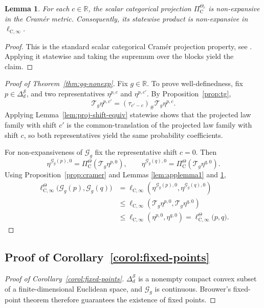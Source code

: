 \documentclass{article}
\newtheorem{lemma}[theorem]{Lemma}
\newcommand{\X}{\mathcal{S}}
\newcommand{\R}{\mathbb{R}}
\begin{document}
\begin{lemma}\label{lem:applemma2}
For each $c \in \R$, the scalar categorical projection $\Pi^{\Theta_c}_\mathrm C$ is non-expansive in the Cram\'er metric. Consequently, its statewise product is non-expansive in $\ell_{\mathrm C, \infty}$.
\end{lemma}
\begin{proof}
This is the standard scalar categorical Cram\'er projection property, see \citet{rowland2018analysis}. Applying it statewise and taking the supremum over the blocks yield the claim.
\end{proof}
\begin{proof}[Proof of Theorem~\ref{thm:gg-nonexp}]
Fix $g \in \R$. To prove well-definedness, fix $p \in \Delta^\X_d$, and two representatives $\eta^{p, c}$ and $\eta^{p, c'}$. By Proposition~\ref{prop:tg},
\begin{equation}
\mathcal T_g \eta^{p, c'} = (\tau_{c'-c})_\# \mathcal T_g \eta^{p, c}.
\end{equation}
Applying Lemma~\ref{lem:proj-shift-equiv} statewise shows that the projected law family with shift $c'$ is the common-translation of the projected law family with shift $c$, so both representatives yield the same probability coefficients.

For non-expansiveness of $\mathcal G_g$ fix the representative shift $c = 0$. Then
\begin{equation}
\eta^{\mathcal G_g(p), 0} = \Pi^\Theta_\mathrm C(\mathcal T_g \eta^{p, 0}), \qquad \eta^{\mathcal G_g(q), 0} =\Pi^\Theta_\mathrm C(\mathcal T_g \eta^{q, 0}).
\end{equation}
Using Proposition~\ref{prop:cramer} and Lemmas \ref{lem:applemma1} and \ref{lem:applemma2},
\begin{equation}
\begin{aligned}
\ell^\Theta_{\mathrm C, \infty}\bigl(\mathcal G_g(p), \mathcal G_g(q)\bigr) &= \ell_{\mathrm C, \infty}(\eta^{\mathcal G_g(p), 0}, \eta^{\mathcal G_g(q), 0}) \\
&\le \ell_{\mathrm C, \infty}(\mathcal T_g \eta^{p,0}, \mathcal T_g \eta^{q, 0}) \\
&\le \ell_{\mathrm C, \infty}(\eta^{p, 0}, \eta^{q, 0}) = \ell^\Theta_{\mathrm C, \infty}\bigl(p, q).
\end{aligned}
\end{equation}
\end{proof}

\subsection{Proof of Corollary~\ref{corol:fixed-points}}
\begin{proof}[Proof of Corollary~\ref{corol:fixed-points}]
$\Delta^\X_d$ is a nonempty compact convex subset of a finite-dimensional Euclidean space, and $\mathcal G_g$ is continuous. Brouwer's fixed-point theorem \citep{aliprantis2006infinite} therefore guarantees the existence of fixed points.
\end{proof}
\end{document}
